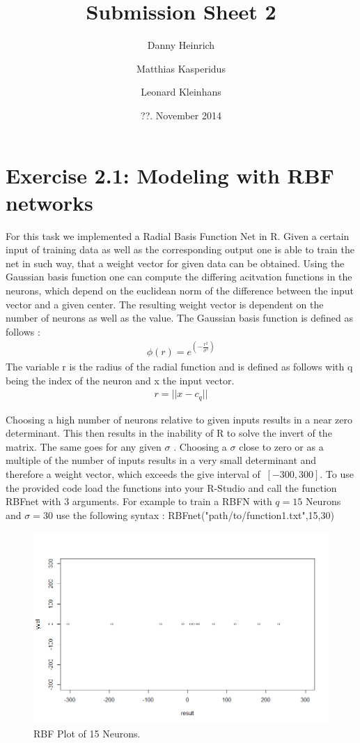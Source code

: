 \documentclass{scrartcl}
\title{Submission Sheet 2}
\author{Danny Heinrich \and Matthias Kasperidus \and Leonard Kleinhans}
\date{??. November 2014}
\begin{document}
\maketitle

\section{Exercise 2.1: Modeling with RBF networks}
For this task we implemented a Radial Basis Function Net in R. Given a certain input of training data as well as the corresponding output one is able to train the net in such way, that a weight vector 
for given data can be obtained. Using the Gaussian basis function one can compute the differing acitvation functions in the neurons, which depend on  the euclidean norm of the difference between the input vector and
a given center. The resulting weight vector is dependent on the number of neurons as well as the value. The Gaussian basis function is defined as follows :
\begin{align*}
\phi (r) = e^{(-\frac{r^2}{\sigma^2})} 
\end{align*}
The variable r is the radius of the radial function and is defined as follows with q being the index of the neuron and x the input vector.
\begin{align*}
r = ||x-c_q||
\end{align*}

Choosing a high number of neurons relative to given inputs results in a near zero determinant. This then results in the inability of R to solve the invert of the matrix. The same goes for any given $\sigma$ . Choosing a $\sigma$ close to zero or as a multiple of the number of inputs results in a very small determinant and therefore a weight vector, which exceeds the give interval of $\ [-300,300]$.
To use the provided code load the functions into your R-Studio and call the function RBFnet with 3 arguments. For example to train a RBFN with $ q = 15$ Neurons and $\sigma = 30$ use the following syntax : 
RBFnet("path/to/function1.txt",15,30)
\begin{figure}[ht]
\begin{center}
\includegraphics[scale=0.5]{RBF.png}
\end{center}
\caption{RBF Plot of 15 Neurons.}
\label{Img:RBFNetPlot}
\end{figure}
\end{document}
